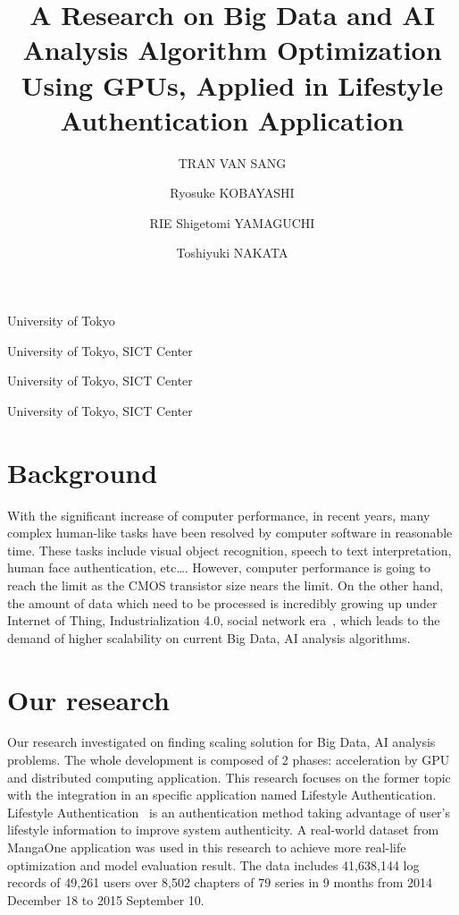 \documentclass[English]{dicomopapers}
\begin{document}
\title{A Research on Big Data and AI Analysis Algorithm Optimization Using GPUs, Applied in Lifestyle Authentication Application}

\author{TRAN VAN SANG}{University of Tokyo}
\author{Ryosuke KOBAYASHI}{University of Tokyo, SICT Center}
\author{RIE Shigetomi YAMAGUCHI}{University of Tokyo, SICT Center}
\author{Toshiyuki NAKATA}{University of Tokyo, SICT Center}

\maketitle

\section{Background}
With the significant increase of computer performance, in recent years, many complex human-like tasks have been resolved by computer software in reasonable time. These tasks include visual object recognition, speech to text interpretation, human face authentication, etc\ldots. However, computer performance is going to reach the limit as the CMOS transistor size nears the limit. On the other hand, the amount of data which need to be processed is incredibly growing up under Internet of Thing, Industrialization 4.0, social network era~\cite{lohr2012age}, which leads to the demand of higher scalability on current Big Data, AI analysis algorithms.

\section{Our research}
Our research investigated on finding scaling solution for Big Data, AI analysis problems.
The whole development is composed of 2 phases: acceleration by GPU and distributed computing application. This research focuses on the former topic with the integration in an specific application named Lifestyle Authentication. Lifestyle Authentication~\cite{weko_175884_1} is an authentication method taking advantage of user’s lifestyle information to improve system authenticity. A real-world dataset from MangaOne application was used in this research to achieve more real-life optimization and model evaluation result. The data includes 41,638,144 log records of 49,261 users over 8,502 chapters of 79 series in 9 months from 2014 December 18 to 2015 September 10.
\end{document}
